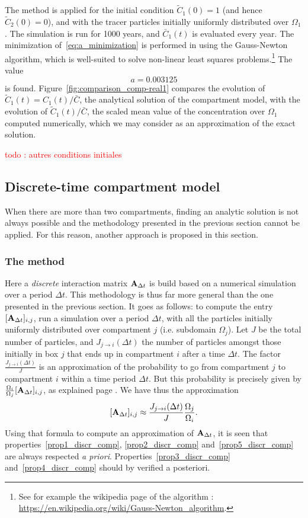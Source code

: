 The method is applied for the initial condition $\tilde C_1(0) = 1$ (and hence $\tilde C_2(0) = 0$), and with the tracer particles initially uniformly distributed over $\Omega_1$. The simulation is run for 1000 years, and $\bar C_1(t)$ is evaluated every year. The minimization of~\eqref{eq:a_minimization} is performed in \matlab using the Gauss-Newton algorithm, which is well-suited to solve non-linear least squares problems.\footnote{See for example the wikipedia page of the algorithm : \url{https://en.wikipedia.org/wiki/Gauss-Newton_algorithm}.} The value 
\begin{equation}
	a = 0.003125
\end{equation}
is found. Figure~\ref{fig:comparison_comp-real1} compares the evolution of $\tilde C_1(t) = C_1(t)/\bar C$, the analytical solution of the compartment model, with the evolution of $\tilde C_1(t)/\bar C$, the scaled mean value of the concentration over $\Omega_1$ computed numerically, which we may consider as an approximation of the exact solution.

\textcolor{red}{todo : autres conditions initiales}

\subsection{Discrete-time compartment model} \label{sec:dtcm}
When there are more than two compartments, finding an analytic solution is not always possible and the methodology presented in the previous section cannot be applied. For this reason, another approach is proposed in this section. 
\subsubsection{The method}
Here a \textit{discrete} interaction matrix $\mathbf A_{\Delta t}$ is build based on a numerical simulation over a period $\Delta t$. This methodology is thus far more general than the one presented in the previous section. It goes as follows: to compute the entry $[\mathbf A_{\Delta t}]_{i,j}$, run a simulation over a period $\Delta t$, with all the particles initially uniformly distributed over compartment $j$ (i.e. subdomain $\Omega_j$). Let $J$ be the total number of particles, and $J_{j \rightarrow i}(\Delta t)$ the number of particles amongst those initially in box $j$ that ends up in compartment $i$ after a time $\Delta t$. The factor $\frac{J_{j \rightarrow i}(\Delta t)}{J}$ is an approximation of the probability to go from compartment $j$ to compartment $i$ within a time period $\Delta t$. But this probability is precisely given by $\frac{\Omega_i}{\Omega_j}[\mathbf A_{\Delta t}]_{i,j}$, as explained page \pageref{page:probability_interpretation}. We have thus the approximation
\begin{equation} \label{eq:A_approx_discr}
	[\mathbf A_{\Delta t}]_{i,j} \approx \frac{J_{j \rightarrow i}(\Delta t)}{J}\frac{\Omega_j}{\Omega_i}.
\end{equation}
Using that formula to compute an approximation of $\mathbf A_{\Delta t}$, it is seen that properties~\ref{prop1_discr_comp}, \ref{prop2_discr_comp} and~\ref{prop5_discr_comp} are always respected \textit{a priori}. Properties~\ref{prop3_discr_comp} and~\ref{prop4_discr_comp} should by verified a posteriori.
